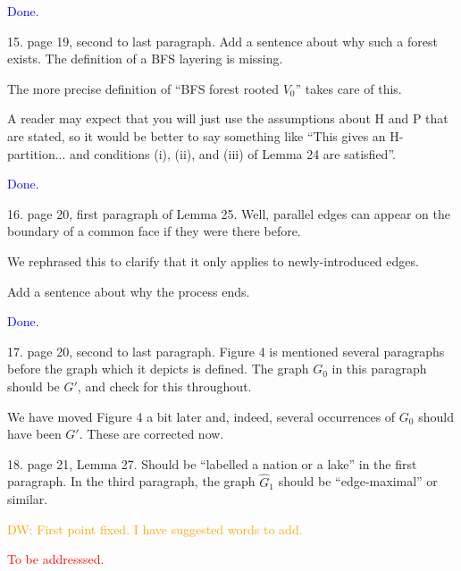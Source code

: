 \documentclass[12pt]{article}
\newcommand{\done}{\textcolor{blue}{Done.}}
\newcommand{\tba}{\textcolor{red}{To be addresssed.}}
\newenvironment{response}{\color{blue}}{}
\begin{document}
\done

15. page 19, second to last paragraph. Add a sentence about why such
a forest exists. The definition of a BFS layering is missing.


\begin{response}
  The more precise definition of ``BFS forest rooted $V_0$'' takes care of this.
\end{response}

A reader may expect that you will just use the assumptions about H and P that are stated, so it would be better to say something like “This gives an H-partition... and conditions (i), (ii), and (iii) of Lemma 24 are satisfied”.

\done


16. page 20, first paragraph of Lemma 25. Well, parallel edges can appear
on the boundary of a common face if they were there before.

\begin{response}
  We rephrased this to clarify that it only applies to newly-introduced edges.
\end{response}


Add a sentence about why the process ends.

\done

17. page 20, second to last paragraph. Figure 4 is mentioned several paragraphs before the graph which it depicts is defined. The graph $G_0$ in
this paragraph should be $G'$, and check for this throughout.

\begin{response}
  We have moved Figure 4 a bit later and, indeed, several occurrences of $G_0$ should have been $G'$.  These are corrected now.
\end{response}

18. page 21, Lemma 27. Should be “labelled a nation or a lake” in the
first paragraph. In the third paragraph, the graph $\hat{G}_1$ should be “edge-maximal” or similar.

\textcolor{orange}{DW: First point fixed. I have suggested words to add. }

\tba
\end{document}
